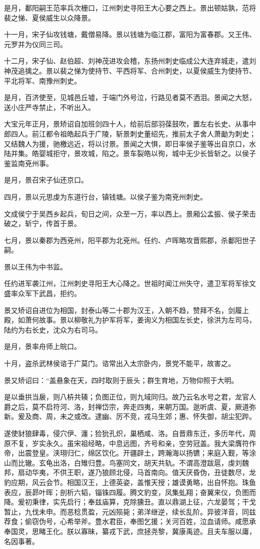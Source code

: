 \documentclass[12pt,UTF8]{ctexbook}
\begin{document}
是月，鄱阳嗣王范率兵次栅口，江州刺史寻阳王大心要之西上。景出顿姑孰，范将裴之悌、夏侯威生以众降景。

十一月，宋子仙攻钱塘，戴僧易降。景以钱塘为临江郡，富阳为富春郡。又王伟、元罗并为仪同三司。

十二月，宋子仙、赵伯超、刘神茂进攻会稽，东扬州刺史临成公大连弃城走，遣刘神茂追擒之。景以裴之悌为使持节、平西将军、合州刺史，以夏侯威生为使持节、平北将军、南豫州刺史。

是月，百济使至，见城邑丘墟，于端门外号泣，行路见者莫不洒泪。景闻之大怒，送小庄严寺禁止，不听出入。

大宝元年正月，景矫诏自加班剑四十人，给前后部羽葆鼓吹，置左右长史、从事中郎四人。前江都令祖皓起兵于广陵，斩景刺史董绍先，推前太子舍人萧勔为刺史；又结魏人为援，驰檄远近，将以讨景。景闻之大惧，即日率侯子鉴等出自京口，水陆并集。皓婴城拒守，景攻城，陷之。景车裂皓以徇，城中无少长皆斩之。以侯子鉴监南兗州事。

是月，景召宋子仙还京口。

四月，景以元思虔为东道行台，镇钱塘。以侯子鉴为南兗州刺史。

文成侯宁于吴西乡起兵，旬日之间，众至一万，率以西上。景厢公孟振、侯子荣击破之，斩宁，传首于景。

七月，景以秦郡为西兗州，阳平郡为北兗州。任约、卢晖略攻晋熙郡，杀鄱阳世子嗣。

景以王伟为中书监。

任约进军袭江州，江州刺史寻阳王大心降之。世祖时闻江州失守，遣卫军将军徐文盛率众军下武昌，拒约。

景又矫诏自进位为相国，封泰山等二十郡为汉王，入朝不趋，赞拜不名，剑履上殿，如萧何故事。景以柳敬礼为护军将军，姜询义为相国左长史，徐洪为左司马，陆约为右长史，沈众为右司马。

是月，景率舟师上皖口。

十月，盗杀武林侯谘于广莫门。谘常出入太宗卧内，景党不能平，故害之。

景又矫诏曰：“盖悬象在天，四时取则于辰头；群生育地，万物仰照于大明。

是以垂拱当扆，则八枿共辏；负图正位，则九域同归。故乃云名水号之君，龙官人爵之后，莫不启符河、洛，封禅岱宗，奔走四夷，来朝万国。逖听虞、夏，厥道弥新。爰及商、周，未之或改。逮幽、厉不竞，戎马生郊；惠、怀失御，胡尘犯跸。

遂使豺狼肆毒，侵穴伊、瀍；猃狁孔炽，巢栖咸、洛。自晋鼎东迁，多历年代，周原不复，岁实永久。虽宋祖经略，中息远图，齐号和亲，空劳冠盖。我大梁膺符作帝，出震登皇。浃珝归仁，绵区饮化。开疆辟土，跨瀚海以扬镳；来庭入觐，等涂山而比辙。玄龟出洛，白雉归豊。鸟塞同文，胡天共轨。不谓高澄跋扈，虔刘魏邦，扇动华夷，不供王职，遂乃狼顾北侵，马首南向。值天厌昏伪，丑徒数尽，龙豹应期，风云会节。相国汉王，上德英姿，盖惟天授；雄谟勇略，出自怀抱。珠鱼表应，辰昴叶晖；剖析六韬，锱铢四履。腾文豹变，凤集虬翔；奋翼来仪，负图而降。爰初秉律，实先启行；奉兹庙算，克除獯丑。直以鼎湖上征，六龙晏驾；干戈暂止，九伐未申。而恶稔贯盈，元凶殒毙；弟洋继逆，续长乱阶。异彼洋音，同兹荐食；偷窃伪号，心希举斧。豊水君臣，奉图乞援；关河百姓，泣血请师。咸愿承奉国灵，思睹王化。朕以寡昧，纂戎下武，庶拯尧黎，冀康禹迹。且夫车服以庸，名因事著。
\end{document}
